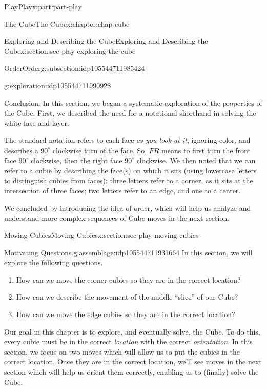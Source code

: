 \documentclass[oneside,10pt,]{book}
\numberwithin{equation}{section}
\begin{document}
\begin{partptx}{Play}{}{Play}{}{}{x:part:part-play}
\begin{chapterptx}{The Cube}{}{The Cube}{}{}{x:chapter:chap-cube}
\begin{sectionptx}{Exploring and Describing the Cube}{}{Exploring and Describing the Cube}{}{}{x:section:sec-play-exploring-the-cube}
\begin{subsectionptx}{Order}{}{Order}{}{}{g:subsection:idp105544711985424}
\begin{exploration}{}{g:exploration:idp105544711990928}
\end{exploration}%
\end{subsectionptx}
\begin{conclusion}{Conclusion.}%
In this section, we began a systematic exploration of the properties of the Cube. First, we described the need for a notational shorthand in solving the white face and layer.%
\par
The standard notation refers to each face \emph{as you look at it}, ignoring color, and describes a \(90^\circ\) clockwise turn of the face. So, \(FR\) means to first turn the front face \(90^\circ\) clockwise, then the right face \(90^\circ\) clockwise. We then noted that we can refer to a cubie by describing the face(s) on which it sits (using lowercase letters to distinguish cubies from faces): three letters refer to a corner, as it sits at the intersection of three faces; two letters refer to an edge, and one to a center.%
\par
We concluded by introducing the idea of order, which will help us analyze and understand more complex sequences of Cube moves in the next section.%
\end{conclusion}%
\end{sectionptx}
%
%
\typeout{************************************************}
\typeout{************************************************}
%
\begin{sectionptx}{Moving Cubies}{}{Moving Cubies}{}{}{x:section:sec-play-moving-cubies}
\begin{assemblage}{Motivating Questions.}{g:assemblage:idp105544711931664}%
In this section, we will explore the following questions. %
\begin{enumerate}
\item{}How can we move the corner cubies so they are in the correct location?%
\item{}How can we describe the movement of the middle ``slice'' of our Cube?%
\item{}How can we move the edge cubies so they are in the correct location?%
\end{enumerate}
%
\end{assemblage}
\begin{introduction}{}%
Our goal in this chapter is to explore, and eventually solve, the Cube. To do this, every cubie must be in the correct \emph{location} with the correct \emph{orientation}. In this section, we focus on two moves which will allow us to put the cubies in the correct location. Once they are in the correct location, we'll see moves in the next section which will help us orient them correctly, enabling us to (finally) solve the Cube.%

\end{introduction}
\end{sectionptx}
\end{chapterptx}
\end{partptx}
\end{document}
